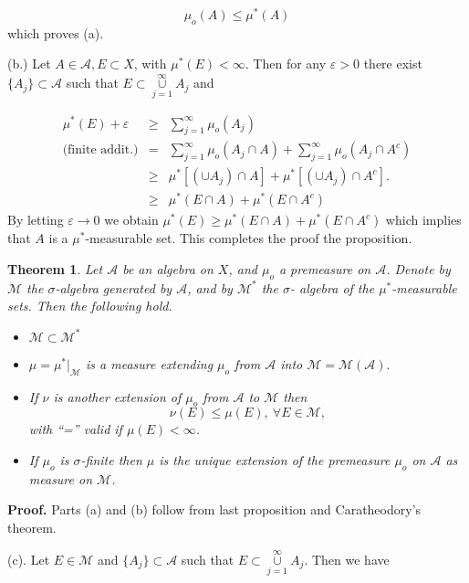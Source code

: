\documentclass[12pt]{report}
\newtheorem{theorem}{Theorem}[section]
\begin{document}
\begin{equation*} \mu_o(A) \le \mu^* (A)
\end{equation*}
 which proves (a).

\medskip
\noindent
 (b.)  Let $A \in \mathcal{A}, E \subset X$, with  $\mu^* (E)<\infty$.  Then for
any
$\varepsilon > 0$ there exist $\{A_j\} \subset \mathcal{A}$ such that $E
\subset
\overset{\infty}{\underset{j=1}{\cup}}  A_j$ and

\begin{eqnarray*}
\mu^* (E) + \varepsilon &\ge& \sum^\infty_{j =1} \mu_o(A_j)\\
\mbox{(finite addit.)} &=& \sum^\infty_{j=1} \mu_o(A_j \cap A) +
\sum^\infty_{j =1}
\mu_o(A_j \cap A^c)\\ &\ge& \mu^*[(\cup A_j) \cap A] + \mu^*[(\cup
A_j)
\cap A^c].\\ &\ge& \mu^*(E \cap A) + \mu^* (E \cap A^c)
\end{eqnarray*} By letting $\varepsilon \longrightarrow 0 $ we obtain
$\mu^* (E) \ge
\mu^* (E \cap A) + \mu^*(E \cap A^c)$ which implies that $A$ is a
$\mu^*$-measurable set.  This completes the  proof the proposition.


\begin{theorem}  Let $\mathcal{A}$ be an algebra on $X$, and
$\mu_o$ a premeasure on $\mathcal{A}$.  Denote by $\mathcal{M}$ the
$\sigma$-algebra generated by
$\mathcal{A}$, and by $\mathcal{M}^*$ the $\sigma$- algebra of the
$\mu^*$-measurable sets.  Then the following hold.
\begin{itemize}
\item[a)]  $\mathcal{M} \subset \mathcal{M}^*$
\item[b)]  $\mu = \mu^*\vert_\mathcal{M} $ is a measure
extending
$\mu_o$ from $\mathcal{A}$ into $\mathcal{M} = \mathcal{M}
(\mathcal{A}).$
\item[c)]  If $\nu$ is another extension of $\mu_o$ from
$\mathcal{A}$ to
$\mathcal{M}$ then
\[\nu(E) \le \mu(E), \ \forall E \in \mathcal{M},\]
with ``='' valid if $\mu (E) < \infty$.
\item[d)]  If $\mu_o$ is $\sigma$-finite then $\mu$ is the unique
extension of the premeasure $\mu_o$ on $\mathcal{A}$ as measure on
$\mathcal{M}$.
\end{itemize}
\end{theorem}
{\bf Proof.}  Parts (a) and (b) follow from last proposition and
Caratheodory's theorem.

\smallskip
\noindent (c). 
 Let
$E \in \mathcal{M}$ and $\{A_j\} \subset \mathcal{A}$ such that $E \subset
\overset{\infty}{\underset{j=1}{\cup}}  A_j$.  Then we have
\end{document}
